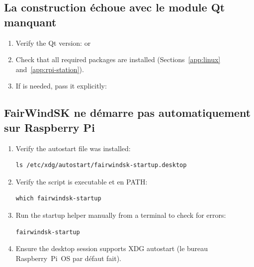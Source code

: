 \subsection{La construction échoue avec le module Qt manquant}

\begin{enumerate}
  \item Verify the Qt version:  or
  \item Check that all required packages are installed
        (Sections~\ref{app:linux} and~\ref{app:rpi-station}).
  \item If  is needed, pass it explicitly:
\end{enumerate}

\subsection{FairWindSK ne démarre pas automatiquement sur Raspberry Pi}

\begin{enumerate}
  \item Verify the autostart file was installed:
\begin{lstlisting}
ls /etc/xdg/autostart/fairwindsk-startup.desktop
\end{lstlisting}
  \item Verify the  script is executable
et en PATH:
\begin{lstlisting}
which fairwindsk-startup
\end{lstlisting}
  \item Run the startup helper manually from a terminal to check for errors:
\begin{lstlisting}
fairwindsk-startup
\end{lstlisting}
  \item Ensure the desktop session supports XDG autostart
(le bureau Raspberry~Pi~OS par défaut fait).
\end{enumerate}
